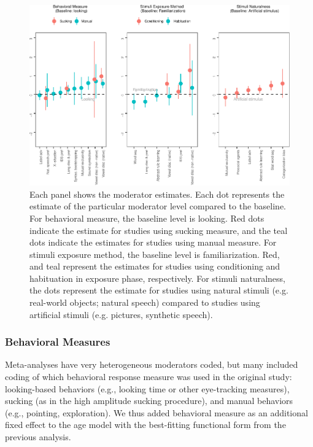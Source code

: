 \documentclass[10pt, letterpaper]{article}
\newenvironment{CodeChunk}{}{}
\begin{document}
\begin{CodeChunk}
\begin{figure}[t!]

{\centering \includegraphics{figs/mod_plot-1} 

}

\caption[Each panel shows the moderator estimates]{Each panel shows the moderator estimates. Each dot represents the estimate of the particular moderator level compared to the baseline. For behavioral measure, the baseline level is looking. Red dots indicate the estimate for studies using sucking measure, and the teal dots indicate the estimates for studies using manual measure. For stimuli exposure method, the baseline level is familiarization. Red, and teal represent the estimates for studies using conditioning and habituation in exposure phase, respectively. For stimuli naturalness, the dots represent the estimate for studies using natural stimuli (e.g. real-world objects; natural speech) compared to studies using artificial stimuli (e.g. pictures, synthetic speech).}\label{fig:mod_plot}
\end{figure}
\end{CodeChunk}

\hypertarget{behavioral-measures}{%
\subsubsection{Behavioral Measures}\label{behavioral-measures}}

Meta-analyses have very heterogeneous moderators coded, but many
included coding of which behavioral response measure was used in the
original study: looking-based behaviors (e.g., looking time or other
eye-tracking measures), sucking (as in the high amplitude sucking
procedure), and manual behaviors (e.g., pointing, exploration). We thus
added behavioral measure as an additional fixed effect to the age model
with the best-fitting functional form from the previous analysis.
\end{document}
